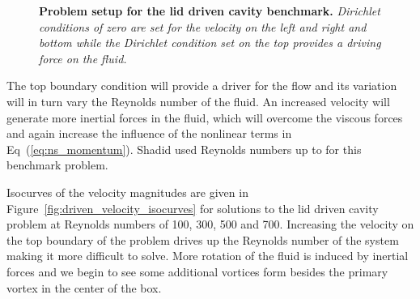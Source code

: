 \begin{figure}[t!]
  \begin{center}
    \scalebox{1.5}{
       }
  \end{center}
  \caption{\textbf{Problem setup for the lid driven cavity benchmark.}
    \textit{Dirichlet conditions of zero are set for the velocity on
      the left and right and bottom while the Dirichlet condition set
      on the top provides a driving force on the fluid.}}
  \label{fig:lid_driven_cavity}
\end{figure}

The top boundary condition will provide a driver for the flow and its
variation will in turn vary the Reynolds number of the fluid. An
increased velocity will generate more inertial forces in the fluid,
which will overcome the viscous forces and again increase the
influence of the nonlinear terms in Eq~(\ref{eq:ns_momentum}). Shadid
used Reynolds numbers up to  for this benchmark problem.

Isocurves of the velocity magnitudes are given in
Figure~\ref{fig:driven_velocity_isocurves} for solutions to the lid
driven cavity problem at Reynolds numbers of 100, 300, 500 and
700. Increasing the velocity on the top boundary of the problem drives
up the Reynolds number of the system making it more difficult to
solve. More rotation of the fluid is induced by inertial forces and
we begin to see some additional vortices form besides the primary
vortex in the center of the box.

